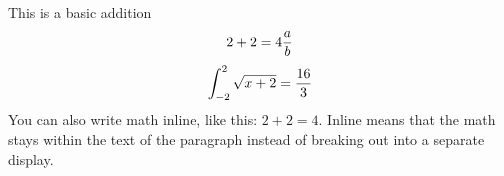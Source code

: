 



This is a basic addition
$$
2 + 2 = 4 
{{a} \over {b}}
$$
$$
\int_{-2}^2 \sqrt{x+2} ={{16} \over {3}}
$$
You can also write math inline, like this: $2 + 2 = 4$. Inline means that the
math stays within the text of the paragraph instead of breaking out into a
separate display.

\bye
